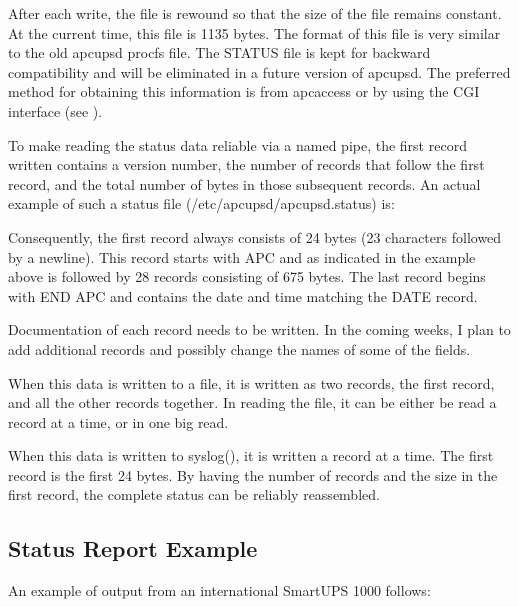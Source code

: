 {{{{{{{{{{{{{{{After each write, the file is rewound so that the size of the file remains
constant. At the current time, this file is 1135 bytes. The format of this
file is very similar to the old apcupsd procfs file. The STATUS file is kept
for backward compatibility and will be eliminated in a future version of
apcupsd. The preferred method for obtaining this information is from apcaccess
or by using the CGI interface (see 
).  

To make reading the status data reliable via a named pipe, the first record
written contains a version number, the number of records that follow the first
record, and the total number of bytes in those subsequent records. An actual
example of such a status file (/etc/apcupsd/apcupsd.status) is:  

Consequently, the first record always consists of 24 bytes (23 characters
followed by a newline). This record starts with APC and as indicated in the
example above is followed by 28 records consisting of 675 bytes. The last
record begins with END APC and contains the date and time matching the DATE
record.  

Documentation of each record needs to be written. In the coming weeks, I plan
to add additional records and possibly change the names of some of the fields.
 

When this data is written to a file, it is written as two records, the first
record, and all the other records together. In reading the file, it can be
either be read a record at a time, or in one big read.  

When this data is written to syslog(), it is written a record at a time. The
first record is the first 24 bytes. By having the number of records and the
size in the first record, the complete status can be reliably reassembled. 

\label{Status-Report-Example}

\subsection*{Status Report Example}

\label{index-Examples_002c-Status-Report-254}
\label{index-Status-255}
An example of output from an international SmartUPS 1000 follows: 

\footnotesize
\begin{verbatim}
     

\end{verbatim}}}}}}}}}}}}}}}}
